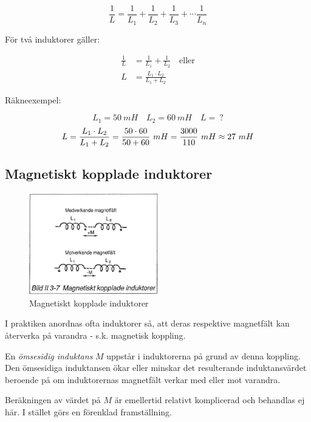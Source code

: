 \[
\frac{1}{L} = \frac{1}{L_1} + \frac{1}{L_2} + \frac{1}{L_3} +
\cdots \frac{1}{L_n}
\]

För två induktorer gäller:

\begin{align*}
  \frac{1}{L} &= \frac{1}{L_1} + \frac{1}{L_2} \quad \text{eller} \\
  L &= \frac{L_1 \cdot L_2}{L_1 + L_2}
\end{align*}

Räkneexempel:

\[L_1 = 50\ mH \quad L_2 = 60\ mH \quad L =\ ?\]
\[
  L = \frac{L_1 \cdot L_2}{L_1 + L_2} \\
  = \frac{50 \cdot 60}{50 + 60}\ mH \\
  = \frac{3000}{110}\ mH \\
  \approx 27\ mH
\]

\subsection{Magnetiskt kopplade induktorer}

\begin{figure}
\includegraphics[width=0.5\textwidth]{images/bild_2_3-07}
\caption{Magnetiskt kopplade induktorer}
\label{fig:BildII3-07}
\end{figure}

I praktiken anordnas ofta induktorer så, att deras respektive magnetfält kan
återverka på varandra - s.k. magnetisk koppling.

En \emph{ömsesidig induktans} \(M\) uppstår i induktorerna på grund av denna
koppling. Den ömsesidiga induktansen ökar eller minskar det resulterande
induktansvärdet beroende på om induktorernas magnetfält verkar med eller mot
varandra.

Beräkningen av värdet på \(M\) är emellertid relativt komplicerad och behandlas
ej här. I stället görs en förenklad framställning.

